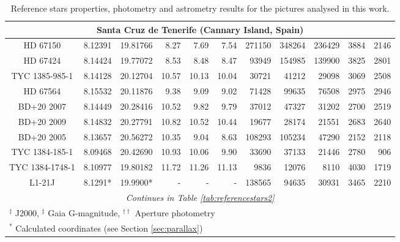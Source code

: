\begin{table*}
{\begin{tabular}{c|cc|rrr|rrr|rr}
\hline
\multicolumn{11}{c}{Santa Cruz de Tenerife (Cannary Island, Spain)}\\
\hline
HD 67150 & 8.12391 & 19.81766 & 8.27 & 7.69 & 7.54 & 271150 & 348264 & 236429 & 3884 & 2146\\
HD 67424 & 8.14424 & 19.77072 & 8.53 & 8.48 & 8.47 & 93949 & 154985 & 139900 & 3825 & 2801\\
TYC 1385-985-1 & 8.14128 & 20.12704 & 10.57 & 10.13 & 10.04 & 30721 & 41212 & 29098 & 3069 & 2508\\
HD 67564 & 8.15532 & 20.11876 & 9.38 & 9.09 & 9.02 & 71428 & 99635 & 76508 & 2975 & 2946\\
BD+20 2007 & 8.14449 & 20.28416 & 10.52 & 9.82 & 9.79 & 37012 & 47327 & 31202 & 2700 & 2519\\
BD+20 2009 & 8.14832 & 20.27791 & 10.82 & 10.52 & 10.44 & 19677 & 28174 & 21551 & 2683 & 2640\\
BD+20 2005 & 8.13657 & 20.56272 & 10.35 & 9.04 & 8.63 & 108293 & 105234 & 47290 & 2152 & 2118\\
TYC 1384-185-1 & 8.09468 & 20.42690 & 10.93 & 10.06 & 9.90 & 33690 & 37133 & 21446 & 2780 & 906\\
TYC 1384-1748-1 & 8.10977 & 19.80182 & 11.72 & 11.26 & 11.13 & 9836 & 12076 & 8110 & 4030 & 1719\\
L1-21J & 8.1291* & 19.9900* & - & - & - & 138565 & 94635 & 30931 & 3465 & 2210\\

\hline
\multicolumn{11}{c}{\it Continues in Table \ref{tab:referencestars2}}\\
\hline\hline
\multicolumn{11}{l}{\footnotesize $^\ddagger$ J2000, $^\ddagger$ Gaia G-magnitude, $^{\dagger\dagger}$ Aperture photometry}\\
\multicolumn{11}{l}{\footnotesize $^*$ Calculated coordinates (see Section \ref{sec:parallax})}\\
\end{tabular}}
\caption{Reference stars properties, photometry and astrometry results for the pictures analysed in this work.\label{tab:referencestars1}}
\end{table*}
